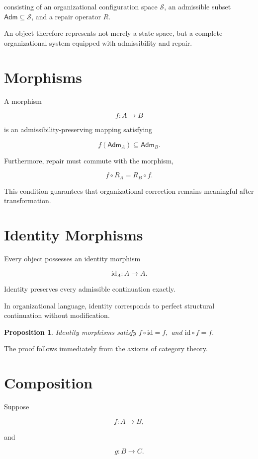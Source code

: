 \documentclass[11pt,oneside]{book}
\numberwithin{equation}{chapter}
\theoremstyle{definition}
\theoremstyle{plain}
\newtheorem{proposition}[definition]{Proposition}
\newcommand{\Adm}{\mathsf{Adm}}
\begin{document}
consisting of an organizational configuration space \(\mathcal S\), an
admissible subset \(\Adm \subseteq \mathcal S\), and a repair operator
\(R\).

An object therefore represents not merely a state space, but a complete
organizational system equipped with admissibility and repair.

\section{Morphisms}

A morphism

\[
f
:
A
\rightarrow
B
\]

is an admissibility-preserving mapping satisfying

\[
f
(
\Adm_A
)
\subseteq
\Adm_B.
\]

Furthermore, repair must commute with the morphism,

\[
f
\circ
R_A
=
R_B
\circ
f.
\]

This condition guarantees that organizational correction remains
meaningful after transformation.

\section{Identity Morphisms}

Every object possesses an identity morphism

\[
\mathrm{id}_A
:
A
\rightarrow
A.
\]

Identity preserves every admissible continuation exactly.

In organizational language, identity corresponds to perfect structural
continuation without modification.

\begin{proposition}
Identity morphisms satisfy
\(
f
\circ
\mathrm{id}
=
f,
\)
and
\(
\mathrm{id}
\circ
f
=
f.
\)
\end{proposition}

The proof follows immediately from the axioms of category theory.

\section{Composition}

Suppose

\[
f
:
A
\rightarrow
B,
\]

and

\[
g
:
B
\rightarrow
C.
\]
\end{document}
